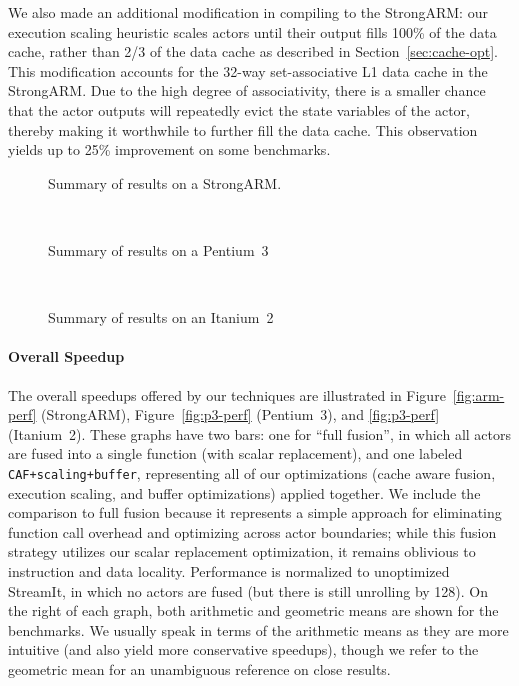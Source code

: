 We also made an additional modification in compiling to the StrongARM:
our execution scaling heuristic scales actors until their output
fills 100\% of the data cache, rather than 2/3 of the data cache as
described in Section~\ref{sec:cache-opt}.  This modification accounts
for the 32-way set-associative L1 data cache in the StrongARM.  Due to
the high degree of associativity, there is a smaller chance that the
actor outputs will repeatedly evict the state variables of the
actor, thereby making it worthwhile to further fill the data cache.
This observation yields up to 25\% improvement on some
benchmarks.

\begin{figure}[t]
\nocaptionrule
\begin{minipage}{3.35in}
\centering
{}
\vspace{-14pt}
\caption{Summary of results on a StrongARM.\protect\label{fig:arm-perf}}
~ \\ \vspace{3pt}

\vspace{-14pt}
\caption{Summary of results on a Pentium~3\protect\label{fig:p3-perf}}
~ \\ \vspace{3pt}

\vspace{-14pt}
\caption{Summary of results on an Itanium~2\protect\label{fig:i2-perf}}
\end{minipage}
\end{figure}

\paragraph*{Overall Speedup} 
The overall speedups offered by our techniques are illustrated in
Figure~\ref{fig:arm-perf} (StrongARM), Figure~\ref{fig:p3-perf}
(Pentium~3), and \ref{fig:p3-perf} (Itanium~2).  These graphs have two
bars: one for ``full fusion'', in which all actors are fused into a
single function (with scalar replacement), and one labeled {\tt
CAF+scaling+buffer}, representing all of our optimizations (cache
aware fusion, execution scaling, and buffer optimizations) applied
together.  We include the comparison to full fusion because it
represents a simple approach for eliminating function call overhead
and optimizing across actor boundaries; while this fusion strategy
utilizes our scalar replacement optimization, it remains oblivious to
instruction and data locality.  Performance is normalized to
unoptimized StreamIt, in which no actors are fused (but there is
still unrolling by 128).  On the right of each graph, both arithmetic
and geometric means are shown for the benchmarks.  We usually speak in
terms of the arithmetic means as they are more intuitive (and also
yield more conservative speedups), though we refer to the geometric
mean for an unambiguous reference on close results.

